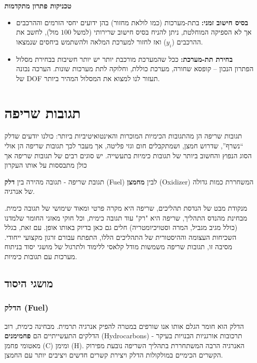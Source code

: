 \documentclass[
  hebrew,
  letterpaper,
  DIV=11,
  numbers=noendperiod]{scrreprt}
\begin{document}
\textbf{טכניקות פתרון מתקדמות}

\begin{itemize}
\item
  \textbf{בסיס חישוב זמני:} בתת-מערכות (כמו לולאת מחזור) בהן ידועים יחסי
  הזרמים וההרכבים אך לא הספיקה המוחלטת, ניתן להניח בסיס חישוב שרירותי
  (למשל \(100\) מול), לחשב את ההרכבים (\(y_{i}\)) ואז לחזור למערכת המלאה
  ולהשתמש ביחסים שנמצאו.
\item
  \textbf{בחירת תת-מערכת:} ככל שהמערכת מורכבת יותר יש יותר חשיבות בבחירת
  מסלול הפתרון הנכון -- קופסא שחורה, מערכת כוללת, וחלוקה לתת מערכות
  שונות. הערכה נכונה של DOF תעזור לנו למצוא את המסלול המהיר ביותר.
\end{itemize}

\section{תגובות
שריפה}\label{ux5eaux5d2ux5d5ux5d1ux5d5ux5ea-ux5e9ux5e8ux5d9ux5e4ux5d4}

תגובות שריפה הן מהתגובות הכימיות המוכרות והאינטואיטיביות ביותר: כולנו
יודעים שדלק ``נשרף'', שדרוש חמצן, ושמתקבלים חום וגזי פליטה, אך מעבר לכך
תגובות שריפה הן אולי הסוג הנפוץ והחשוב ביותר של תגובות כימיות בתעשייה.
יש סוגים רבים של תגובות שריפה אך כולן מתבססות על אותו העקרון

תגובת שריפה - תגובה מהירה בין \textbf{דלק} (Fuel) לבין \textbf{מחמצן}
(Oxidizer) המשחררת כמות גדולה של אנרגיה.

מנקודת מבט של הנדסת תהליכים, שריפה היא מקרה פרטי ומאוד שימושי של תגובה
כימית. מבחינת מהנדס התהליך, שריפה היא "רק" עוד תגובה כימית, וכל חוקי
מאזני החומר שלמדנו (כולל מגיב מגביל, המרה וסטויכיומטריה) חלים גם כאן
בדיוק באותו אופן. עם זאת, בגלל השכיחות העצומה וההיסטורית של התהליכים
הללו, התפתח עבורם ז\textquotesingle רגון מקצועי ייחודי. מסיבה זו, תגובות
שריפה משמשות מודל קלאסי ללימוד ולתרגול של מושגי יסוד בניתוח מערכות עם
תגובות כימיות.

\subsection{מושגי
היסוד}\label{ux5deux5d5ux5e9ux5d2ux5d9-ux5d4ux5d9ux5e1ux5d5ux5d3}

\subsubsection{הדלק (Fuel)}\label{ux5d4ux5d3ux5dcux5e7-fuel}

הדלק הוא חומר הגלם אותו אנו שורפים במטרה להפיק אנרגיה תרמית. מבחינה
כימית, רוב הדלקים התעשייתיים הם \textbf{פחמימנים} (Hydrocarbons) -
תרכובות אורגניות הבנויות בעיקר מאטומי פחמן (C) ומימן (H). האנרגיה הרבה
המשתחררת בתהליך השריפה נובעת מפירוק הקשרים הכימיים במולקולות הדלק ויצירת
קשרים חדשים ויציבים יותר עם החמצן.
\end{document}
